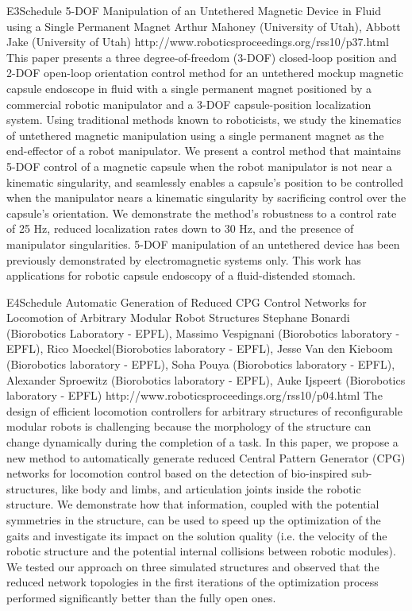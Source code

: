 \begin{spacing}{1.0}
\descriptionPaper
{E3}{Schedule}
{	
5-DOF Manipulation of an Untethered Magnetic Device in Fluid using a Single Permanent Magnet
}
{
Arthur Mahoney (University of Utah), Abbott Jake (University of Utah)
}
{
http://www.roboticsproceedings.org/rss10/p37.html
}
{
This paper presents a three degree-of-freedom (3-DOF) closed-loop position and 2-DOF open-loop orientation control method for an untethered mockup magnetic capsule endoscope in fluid with a single permanent magnet positioned by a commercial robotic manipulator and a 3-DOF capsule-position localization system. Using traditional methods known to roboticists, we study the kinematics of untethered magnetic manipulation using a single permanent magnet as the end-effector of a robot manipulator. We present a control method that maintains 5-DOF control of a magnetic capsule when the robot manipulator is not near a kinematic singularity, and seamlessly enables a capsule’s position to be controlled when the manipulator nears a kinematic singularity by sacrificing control over the capsule’s orientation. We demonstrate the method’s robustness to a control rate of 25 Hz, reduced localization rates down to 30 Hz, and the presence of manipulator singularities. 5-DOF manipulation of an untethered device has been previously demonstrated by electromagnetic systems only. This work has applications for robotic capsule endoscopy of a fluid-distended stomach.
}

\clearpage

\descriptionPaper
{E4}{Schedule}
{	
Automatic Generation of Reduced CPG Control Networks for Locomotion of Arbitrary Modular Robot Structures
}
{
Stephane Bonardi (Biorobotics Laboratory - EPFL), Massimo Vespignani (Biorobotics laboratory - EPFL), Rico Moeckel(Biorobotics laboratory - EPFL), Jesse Van den Kieboom (Biorobotics laboratory - EPFL), Soha Pouya (Biorobotics laboratory - EPFL), Alexander Sproewitz (Biorobotics laboratory - EPFL), Auke Ijspeert (Biorobotics laboratory - EPFL)
}
{
http://www.roboticsproceedings.org/rss10/p04.html
}
{
The design of efficient locomotion controllers for arbitrary structures of reconfigurable modular robots is challenging because the morphology of the structure can change dynamically during the completion of a task. In this paper, we propose a new method to automatically generate reduced Central Pattern Generator (CPG) networks for locomotion control based on the detection of bio-inspired sub-structures, like body and limbs, and articulation joints inside the robotic structure. We demonstrate how that information, coupled with the potential symmetries in the structure, can be used to speed up the optimization of the gaits and investigate its impact on the solution quality (i.e. the velocity of the robotic structure and the potential internal collisions between robotic modules). We tested our approach on three simulated structures and observed that the reduced network topologies in the first iterations of the optimization process performed significantly better than the fully open ones.
}





\end{spacing}
